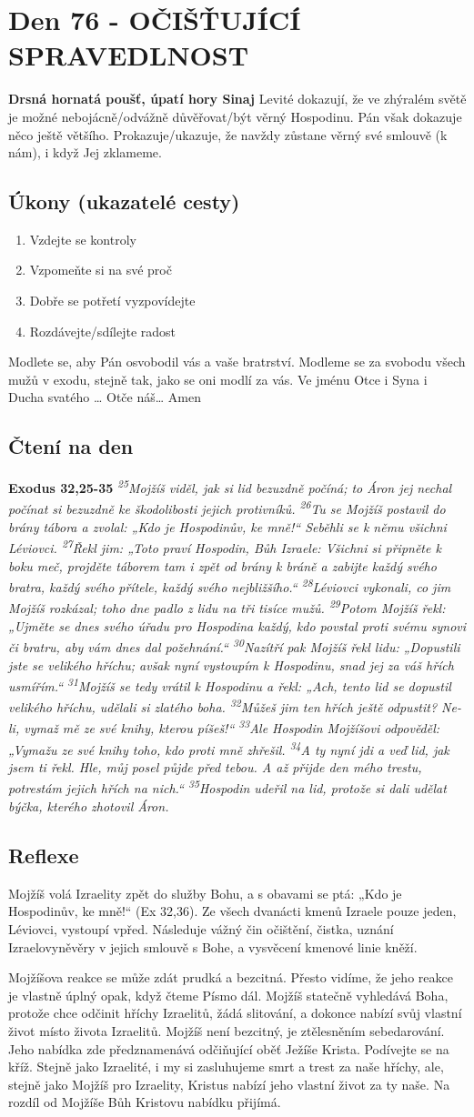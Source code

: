 \documentclass[11pt]{article}
\newcommand{\zacatekJedenactyTyden}{
\textbf{Drsná hornatá poušť, úpatí hory Sinaj} \newline 
Levité dokazují, že ve zhýralém světě je možné nebojácně/odvážně důvěřovat/být věrný Hospodinu. Pán však dokazuje něco ještě většího. Prokazuje/ukazuje, že navždy zůstane věrný své smlouvě (k nám), i když Jej zklameme.

\subsection*{Úkony (ukazatelé cesty)}
\begin{enumerate}
  \item Vzdejte se kontroly
  \item Vzpomeňte si na své proč
  \item Dobře se potřetí vyzpovídejte
  \item Rozdávejte/sdílejte radost
\end{enumerate}
Modlete se, aby Pán osvobodil vás a vaše bratrství. \newline
Modleme se za svobodu všech mužů v exodu, stejně tak, jako se oni modlí za vás.\newline
Ve jménu Otce i Syna i Ducha svatého …  Otče náš… Amen
}
\begin{document}
\newpage
\section{Den 76 - OČIŠŤUJÍCÍ SPRAVEDLNOST}
\zacatekJedenactyTyden
\subsection*{Čtení na den}
\textbf{Exodus 32,25-35}
\newline
\textit{
\textsuperscript{25}Mojžíš viděl, jak si lid bezuzdně počíná; to Áron jej nechal počínat si bezuzdně ke škodolibosti jejich protivníků.
\textsuperscript{26}Tu se Mojžíš postavil do brány tábora a zvolal: „Kdo je Hospodinův, ke mně!“ Seběhli se k němu všichni Léviovci.
\textsuperscript{27}Řekl jim: „Toto praví Hospodin, Bůh Izraele: Všichni si připněte k boku meč, projděte táborem tam i zpět od brány k bráně a zabijte každý svého bratra, každý svého přítele, každý svého nejbližšího.“
\textsuperscript{28}Léviovci vykonali, co jim Mojžíš rozkázal; toho dne padlo z lidu na tři tisíce mužů.
\textsuperscript{29}Potom Mojžíš řekl: „Ujměte se dnes svého úřadu pro Hospodina každý, kdo povstal proti svému synovi či bratru, aby vám dnes dal požehnání.“
\textsuperscript{30}Nazítří pak Mojžíš řekl lidu: „Dopustili jste se velikého hříchu; avšak nyní vystoupím k Hospodinu, snad jej za váš hřích usmířím.“
\textsuperscript{31}Mojžíš se tedy vrátil k Hospodinu a řekl: „Ach, tento lid se dopustil velikého hříchu, udělali si zlatého boha.
\textsuperscript{32}Můžeš jim ten hřích ještě odpustit? Ne-li, vymaž mě ze své knihy, kterou píšeš!“
\textsuperscript{33}Ale Hospodin Mojžíšovi odpověděl: „Vymažu ze své knihy toho, kdo proti mně zhřešil.
\textsuperscript{34}A ty nyní jdi a veď lid, jak jsem ti řekl. Hle, můj posel půjde před tebou. A až přijde den mého trestu, potrestám jejich hřích na nich.“
\textsuperscript{35}Hospodin udeřil na lid, protože si dali udělat býčka, kterého zhotovil Áron.
}

\subsection*{Reflexe}
Mojžíš volá Izraelity zpět do služby Bohu, a s obavami se ptá: „Kdo je Hospodinův, ke mně!“ (Ex 32,36). Ze všech
dvanácti kmenů Izraele pouze jeden, Léviovci, vystoupí vpřed. Následuje vážný čin očištění, čistka, uznání
Izraelovyněvěry v jejich smlouvě s Bohe, a vysvěcení kmenové linie kněží.

Mojžíšova reakce se může zdát prudká a bezcitná. Přesto vidíme, že jeho reakce je vlastně úplný opak, když čteme
Písmo dál. Mojžíš statečně vyhledává Boha, protože chce odčinit hříchy Izraelitů, žádá slitování, a dokonce nabízí svůj
vlastní život místo života Izraelitů. Mojžíš není bezcitný, je ztělesněním sebedarování. Jeho nabídka zde
předznamenává odčiňující oběť Ježíše Krista. Podívejte se na kříž. Stejně jako Izraelité, i my si zasluhujeme smrt a
trest za naše hříchy, ale, stejně jako Mojžíš pro Izraelity, Kristus nabízí jeho vlastní život za ty naše. Na rozdíl
od Mojžíše Bůh Kristovu nabídku přijímá.
\end{document}
